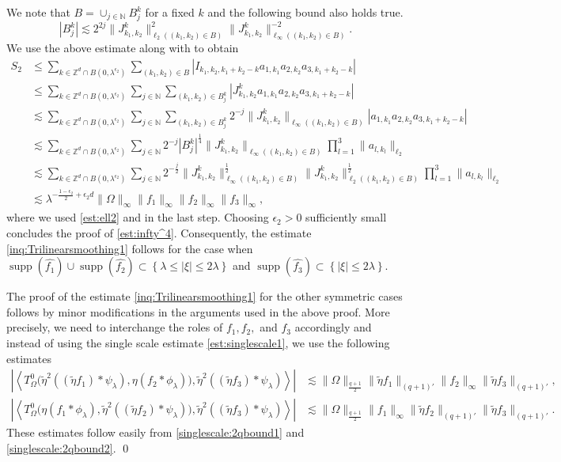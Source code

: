 \documentclass[a4paper,reqno]{amsart}
\newcommand{\N}{{\mathbb N}}
\newcommand{\Z}{{\mathbb Z}}
\newcommand{\supp}[1]{\operatorname{supp}(#1)}   %
\theoremstyle{definition}
\numberwithin{equation}{section}
\begin{document}
We note that $B=\cup_{j\in\N}B_j^k$ for a fixed $k$ and the following bound also holds true.
\begin{equation*}
	|B_j^k|\lesssim2^{2j}\|J_{k_1,k_2}^k\|_{\ell_2((k_1,k_2)\in B)}^2\|J_{k_1,k_2}^k\|_{\ell_\infty((k_1,k_2)\in B)}^{-2}.
\end{equation*}
We use the above estimate along with  to obtain
\begin{align*}
	S_2&\leq\sum_{k\in\Z^d\cap B(0,\lambda^{\epsilon_2})}\sum_{(k_1,k_2)\in B}|I_{k_1,k_2,k_1+k_2-k}a_{1,k_1}a_{2,k_2}a_{3,k_1+k_2-k}|\\
	&\leq\sum_{k\in\Z^d\cap B(0,\lambda^{\epsilon_2})}\sum_{j\in\N}\sum_{(k_1,k_2)\in B_j^k}|J_{k_1,k_2}^ka_{1,k_1}a_{2,k_2}a_{3,k_1+k_2-k}|\\
	&\lesssim\sum_{k\in\Z^d\cap B(0,\lambda^{\epsilon_2})}\sum_{j\in\N}\sum_{(k_1,k_2)\in B_j^k}2^{-j}\|J_{k_1,k_2}^k\|_{\ell_\infty((k_1,k_2)\in B)}|a_{1,k_1}a_{2,k_2}a_{3,k_1+k_2-k}|\\
	&\lesssim\sum_{k\in\Z^d\cap B(0,\lambda^{\epsilon_2})}\sum_{j\in\N}2^{-j}|B_j^k|^\frac{1}{4}\|J_{k_1,k_2}^k\|_{\ell_\infty((k_1,k_2)\in B)}\prod_{l=1}^3\|a_{l,k_l}\|_{\ell_2}\\
	&\lesssim\sum_{k\in\Z^d\cap B(0,\lambda^{\epsilon_2})}\sum_{j\in\N}2^{-\frac{j}{2}}\|J_{k_1,k_2}^k\|^\frac{1}{2}_{\ell_\infty((k_1,k_2)\in B)}\|J_{k_1,k_2}^k\|^\frac{1}{2}_{\ell_2((k_1,k_2)\in B)}\prod_{l=1}^3\|a_{l,k_l}\|_{\ell_2}\\
	&\lesssim\lambda^{-\frac{1-\epsilon_2}{2}+\epsilon_2d}\|\Omega\|_\infty\|f_1\|_\infty\|f_2\|_\infty\|f_3\|_\infty,
\end{align*}
where we used \eqref{est:ell2} and  in the last step.
Choosing $\epsilon_2>0$ sufficiently small concludes the proof of \eqref{est:infty^4}. Consequently, the estimate \eqref{inq:Trilinearsmoothing1} follows for the case when $\supp{\widehat{f_{1}}}\cup\supp{\widehat{f_{2}}}\subset\left\{\lambda\leq|\xi|\leq2\lambda\right\}$ and $\supp{\widehat{f_{3}}}\subset\left\{|\xi|\leq2\lambda\right\}$.

The proof of the estimate \eqref{inq:Trilinearsmoothing1} for the other symmetric cases follows by  minor modifications in the arguments used in the above proof. More precisely, we need to interchange the roles of $f_1,f_2,$ and $f_3$ accordingly and instead of using the single scale estimate \eqref{est:singlescale1}, we use the following estimates
\begin{align*}
	\left|\left\langle T^0_\Omega\Big(\widetilde\eta^2((\widetilde\eta f_1)*\psi_\lambda),\eta(f_2*\phi_{\lambda})\Big),\widetilde\eta^2((\widetilde\eta f_3)*\psi_\lambda)\right\rangle\right|&\lesssim\|\Omega\|_{\frac{q+1}{2}}\|\widetilde\eta f_1\|_{(q+1)'}\|f_2\|_{\infty}\|\widetilde\eta f_3\|_{(q+1)'},\\
	\left|\left\langle T^0_\Omega\Big(\eta(f_1*\phi_{\lambda}),\widetilde\eta^2((\widetilde\eta f_2)*\psi_\lambda)\Big),\widetilde\eta^2((\widetilde\eta f_3)*\psi_\lambda)\right\rangle\right|&\lesssim\|\Omega\|_{\frac{q+1}{2}}\|f_1\|_\infty\|\widetilde\eta f_2\|_{(q+1)'}\|\widetilde\eta f_3\|_{(q+1)'}.
\end{align*}
These estimates follow easily from \eqref{singlescale:2qbound1} and \eqref{singlescale:2qbound2}.
\qed
\end{document}
